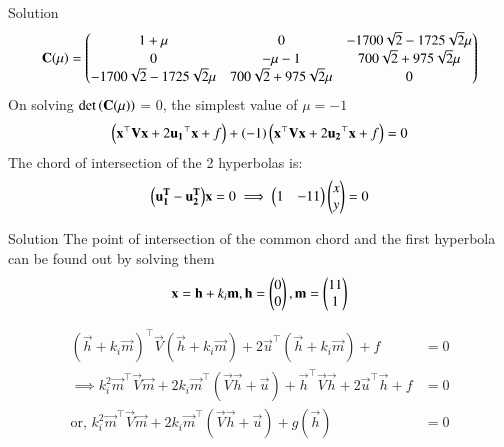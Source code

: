 \documentclass{beamer}
\begin{document}
\begin{frame}{Solution}
\begin{align}
\mathbf{C(\mu)} = \begin{pmatrix}1+\mu & 0 & -1700\sqrt{2} -1725\sqrt{2}\mu \\ 0 & -\mu - 1 & 700\sqrt{2}+  975\sqrt{2}\mu \\ -1700\sqrt{2} -1725\sqrt{2}\mu & 700\sqrt{2}+ 975\sqrt{2}\mu & 0\end{pmatrix}
\end{align}
On solving $\det{\ensuremath{\left(\mathbf{C(\mu)}\right)}}$ = 0, the simplest value of $\mu = -1$
\begin{align}
\left(\mathbf{x}^\top\mathbf{V}\mathbf{x} + 2\mathbf{u_1}^\top\mathbf{x} + f\right) + \left(-1\right)\left(\mathbf{x}^\top\mathbf{V}\mathbf{x} + 2\mathbf{u_2}^\top\mathbf{x} + f\right) = 0
\end{align}
The chord of intersection of the 2 hyperbolas is:
\begin{align}
\mathbf{\left(u_1^T - u_2^T\right)}\mathbf{x} = 0 \implies \begin{pmatrix}1 & -11\end{pmatrix}\begin{pmatrix}x \\ y\end{pmatrix} = 0
\end{align}

\end{frame}

\begin{frame}{Solution}
The point of intersection of the common chord and the first hyperbola can be found out by solving them
\begin{align}
\mathbf{x} = \mathbf{h} + k_i\mathbf{m}, \mathbf{h} = \begin{pmatrix}0 \\ 0\end{pmatrix}, \mathbf{m} = \begin{pmatrix}11 \\ 1\end{pmatrix}
\end{align}

\begin{align}
(\vec{h} + k_i \vec{m})^{\top} \vec{V} (\vec{h} + k_i \vec{m}) + 2\vec{u}^{\top} (\vec{h} + k_i \vec{m}) + f &= 0 \\
\implies k_i^{2} \vec{m}^{\top}\vec{V}\vec{m} + 2k_i \vec{m}^{\top} (\vec{V}\vec{h} + \vec{u}) + \vec{h}^{\top}\vec{V}\vec{h} + 2\vec{u}^{\top}\vec{h} + f &= 0 \\
\text{or, } k_i^{2} \vec{m}^{\top}\vec{V}\vec{m} + 2k_i \vec{m}^{\top} (\vec{V}\vec{h} + \vec{u}) + g(\vec{h}) &= 0
\end{align}

\end{frame}
\end{document}
